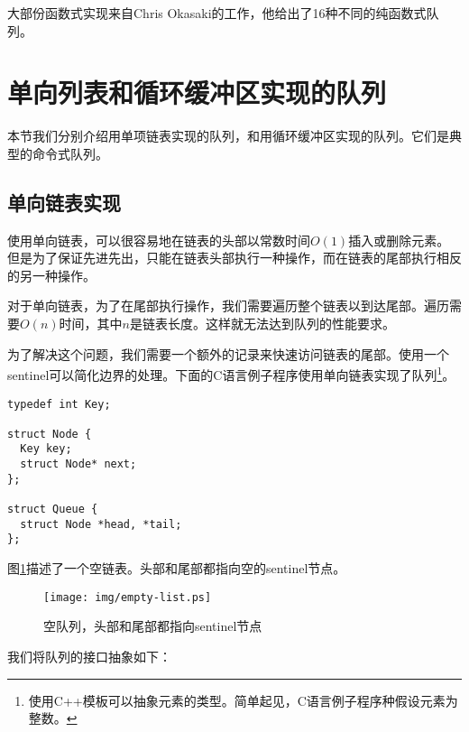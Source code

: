 \documentclass[UTF8]{article}
\begin{document}
大部份函数式实现来自Chris Okasaki的工作\cite{okasaki-book}，他给出了16种不同的纯函数式队列。

\section{单向列表和循环缓冲区实现的队列}

本节我们分别介绍用单项链表实现的队列，和用循环缓冲区实现的队列。它们是典型的命令式队列。

\subsection{单向链表实现}

使用单向链表，可以很容易地在链表的头部以常数时间$O(1)$插入或删除元素。但是为了保证先进先出，只能在链表头部执行一种操作，而在链表的尾部执行相反的另一种操作。

对于单向链表，为了在尾部执行操作，我们需要遍历整个链表以到达尾部。遍历需要$O(n)$时间，其中$n$是链表长度。这样就无法达到队列的性能要求。

为了解决这个问题，我们需要一个额外的记录来快速访问链表的尾部。使用一个sentinel可以简化边界的处理。下面的C语言例子程序使用单向链表实现了队列\footnote{使用C++模板可以抽象元素的类型。简单起见，C语言例子程序种假设元素为整数。}。

\lstset{language=C}
\begin{lstlisting}
typedef int Key;

struct Node {
  Key key;
  struct Node* next;
};

struct Queue {
  struct Node *head, *tail;
};
\end{lstlisting}

图\ref{fig:empty-list}描述了一个空链表。头部和尾部都指向空的sentinel节点。

\begin{figure}[htbp]
  \centering
  \texttt{[image: img/empty-list.ps]}
  \caption{空队列，头部和尾部都指向sentinel节点} \label{fig:empty-list}
\end{figure}

我们将队列的接口抽象如下：

\begin{algorithmic}
\EndFunction
{}
\EndFunction
{}
\EndFunction
{}
\EndFunction
{}
\EndFunction
\end{algorithmic}
\end{document}
